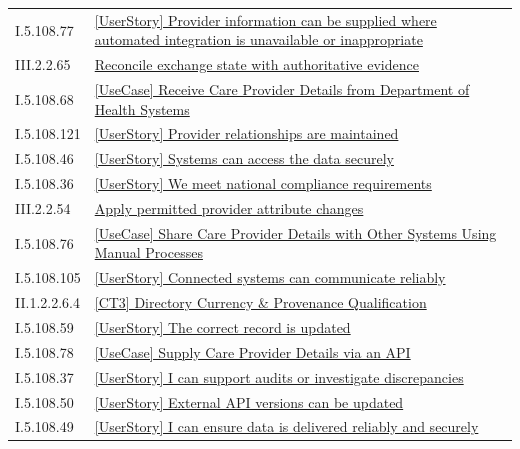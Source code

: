 \begin{longtable}{p{.22\linewidth}p{.73\linewidth}}
I.5.108.77 & \hyperref[element:08a301efe30e4e349ce58680d026cd95]{[UserStory] Provider information can be supplied where automated integration is unavailable or inappropriate} \\
III.2.2.65 & \hyperref[element:08c2d05dd0174cc28288ed4ab0bc05d2]{Reconcile exchange state with authoritative evidence} \\
I.5.108.68 & \hyperref[element:0abd34d6d86f4488b51537da20927eb4]{[UseCase] Receive Care Provider Details from Department of Health Systems} \\
I.5.108.121 & \hyperref[element:0f8decdfeb8a4bd1925ae2439e2e2a5d]{[UserStory] Provider relationships are maintained} \\
I.5.108.46 & \hyperref[element:1955ecf2763d42499a2b923168fb01bf]{[UserStory] Systems can access the data securely} \\
I.5.108.36 & \hyperref[element:1cc94d8bee0d4aca957d7c44f47451da]{[UserStory] We meet national compliance requirements} \\
III.2.2.54 & \hyperref[element:1ceb340083984b9fbe393532c69abe72]{Apply permitted provider attribute changes} \\
I.5.108.76 & \hyperref[element:1fd9c4ee243b4507b0fcbc3d86ae2fcd]{[UseCase] Share Care Provider Details with Other Systems Using Manual Processes} \\
I.5.108.105 & \hyperref[element:1fdfaddbad224da6b065d597aac9c3bc]{[UserStory] Connected systems can communicate reliably} \\
II.1.2.2.6.4 & \hyperref[element:21e0c3d5b39b4d6c9c082241150f1f09]{[CT3] Directory Currency \& Provenance Qualification} \\
I.5.108.59 & \hyperref[element:2691591dde0e4476b849dbd95ba895cb]{[UserStory] The correct record is updated} \\
I.5.108.78 & \hyperref[element:26d1c9aa516d49fca8055c0a10aef672]{[UseCase] Supply Care Provider Details via an API} \\
I.5.108.37 & \hyperref[element:280ea234f37b47fe98db64183d3fa889]{[UserStory] I can support audits or investigate discrepancies} \\
I.5.108.50 & \hyperref[element:2e8a7313e9364162be5cdc96bfa34a9d]{[UserStory] External API versions can be updated} \\
I.5.108.49 & \hyperref[element:2eb5667b04274fbc9eb9ef798f8a1dd5]{[UserStory] I can ensure data is delivered reliably and securely} \\

\end{longtable}
